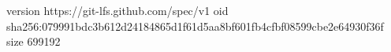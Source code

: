 version https://git-lfs.github.com/spec/v1
oid sha256:079991bdc3b612d24184865d1f61d5aa8bf601fb4cfbf08599cbe2e64930f36f
size 699192
